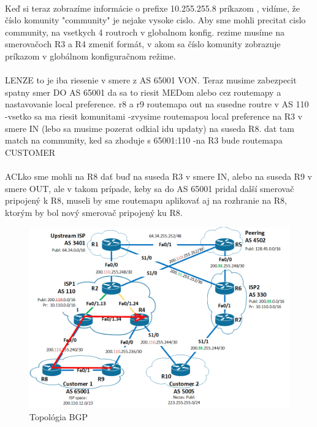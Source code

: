 \documentclass[12pt,twoside,a4paper]{report}
\begin{document}
\paragraph{}
Keď si teraz zobrazíme informácie o prefixe 10.255.255.8 príkazom , vidíme, že číslo komunity "community" je nejake vysoke cislo. Aby sme mohli precitat cislo community, na vsetkych 4 routroch v globalnom konfig. rezime musíme na smerovačoch R3 a R4 zmeniť formát, v akom sa číslo komunity zobrazuje príkazom  v globálnom konfiguračnom režime.

\paragraph{}
LENZE to je iba riesenie v smere z AS 65001 VON. Teraz musime zabezpecit spatny smer DO AS 65001
da sa to riesit MEDom alebo cez routemapy a nastavovanie local preference.
r8 a r9 routemapa out na susedne routre v AS 110
-vsetko sa ma riesit komunitami
-zvysime routemapou local preference na R3 v smere IN (lebo sa musime pozerat odkial idu updaty) na suseda R8. dat tam match na community, ked sa zhoduje s 65001:110
-na R3 bude routemapa CUSTOMER

\paragraph{}
ACLko  sme mohli na R8 dať buď na suseda R3 v smere IN, alebo na suseda R9 v smere OUT, ale v takom prípade, keby sa do AS 65001 pridal další smerovač pripojený k R8, museli by sme routemapu aplikovať aj na rozhranie na R8, ktorým by bol nový smerovač pripojený ku R8.

\begin{figure}[!htbp]
\centering
\includegraphics[width=14cm,keepaspectratio]{bgp_isis_r3_r8_primary}
\caption{Topológia BGP}
\label{fig:bgp_isis_topo_r3_r8}
\end{figure}
\end{document}

